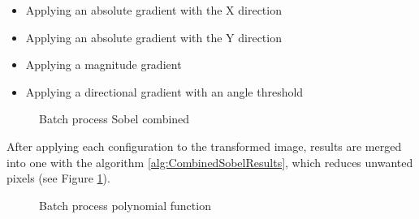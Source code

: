 \begin{itemize}
  \item Applying an absolute gradient with the X direction
  \item Applying an absolute gradient with the Y direction
  \item Applying a magnitude gradient
  \item Applying a directional gradient with an angle threshold 
\end{itemize}

\begin{figure}[htbp]
\centering
{}
\caption{Batch process Sobel combined}
\label{fig:BatchProcessEdge}
\end{figure}

After applying each configuration to the transformed image, results are merged into one with the algorithm \ref{alg:CombinedSobelResults}, which reduces unwanted pixels (see Figure \ref{fig:BatchProcessEdge}). 

\begin{figure}[htbp]
\centering
{}
\caption{Batch process polynomial function}
\label{fig:BatchProcessLine}
\end{figure}

